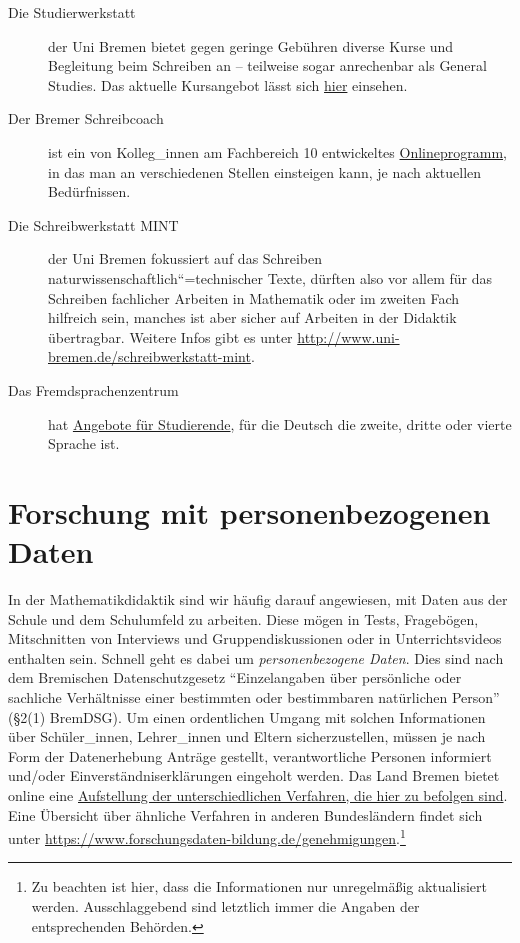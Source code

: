 \documentclass[ngerman,bibliography=totoc,oneside,12pt,a4paper]{scrbook}
\begin{document}
\begin{description}
\item[Die Studierwerkstatt]
der Uni Bremen bietet gegen geringe Gebühren diverse Kurse und
Begleitung beim Schreiben an -- teilweise sogar anrechenbar als General
Studies. Das aktuelle Kursangebot lässt sich
\href{https://www.uni-bremen.de/studierwerkstatt/programm/}{hier}
einsehen.
\item[Der Bremer Schreibcoach]
ist ein von Kolleg\_innen am Fachbereich 10 entwickeltes
\href{http://www.bremer-schreibcoach.uni-bremen.de/}{Onlineprogramm}, in
das man an verschiedenen Stellen einsteigen kann, je nach aktuellen
Bedürfnissen.
\item[Die Schreibwerkstatt MINT]
der Uni Bremen fokussiert auf das Schreiben
naturwissenschaftlich``=technischer Texte, dürften also vor allem für
das Schreiben fachlicher Arbeiten in Mathematik oder im zweiten Fach
hilfreich sein, manches ist aber sicher auf Arbeiten in der Didaktik
übertragbar. Weitere Infos gibt es unter
\url{http://www.uni-bremen.de/schreibwerkstatt-mint}.
\item[Das Fremdsprachenzentrum]
hat \href{http://www.fremdsprachenzentrum-bremen.de}{Angebote für
Studierende}, für die Deutsch die zweite, dritte oder vierte Sprache
ist.
\end{description}

\chapter{Forschung mit personenbezogenen
Daten}\label{forschung-mit-personenbezogenen-daten}

In der Mathematikdidaktik sind wir häufig darauf angewiesen, mit Daten
aus der Schule und dem Schulumfeld zu arbeiten. Diese mögen in Tests,
Fragebögen, Mitschnitten von Interviews und Gruppendiskussionen oder in
Unterrichtsvideos enthalten sein. Schnell geht es dabei um
\emph{personenbezogene Daten}. Dies sind nach dem Bremischen
Datenschutzgesetz \enquote{Einzelangaben über persönliche oder sachliche
Verhältnisse einer bestimmten oder bestimmbaren natürlichen Person}
(§2(1) BremDSG). Um einen ordentlichen Umgang mit solchen Informationen
über Schüler\_innen, Lehrer\_innen und Eltern sicherzustellen, müssen je
nach Form der Datenerhebung Anträge gestellt, verantwortliche Personen
informiert und/oder Einverständniserklärungen eingeholt werden. Das Land
Bremen bietet online eine
\href{https://www.bildung.bremen.de/sixcms/detail.php?gsid=bremen117.c.5312.de}{Aufstellung
der unterschiedlichen Verfahren, die hier zu befolgen sind}. Eine
Übersicht über ähnliche Verfahren in anderen Bundesländern findet sich
unter
\url{https://www.forschungsdaten-bildung.de/genehmigungen}.\footnote{Zu
  beachten ist hier, dass die Informationen nur unregelmäßig
  aktualisiert werden. Ausschlaggebend sind letztlich immer die Angaben
  der entsprechenden Behörden.}
\end{document}

